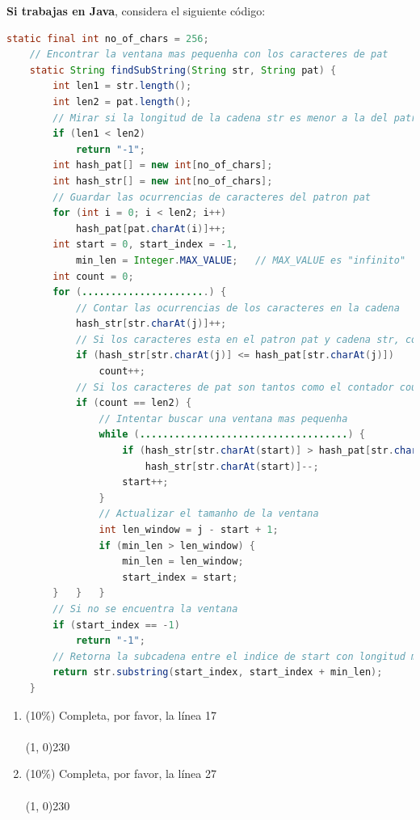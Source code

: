 \documentclass[10 pt]{article}
\begin{document}
\hspace{1 cm}

\textbf{Si trabajas en Java}, considera el siguiente código:

{\footnotesize
\begin{lstlisting}[language = java]
    static final int no_of_chars = 256;
    // Encontrar la ventana mas pequenha con los caracteres de pat
    static String findSubString(String str, String pat) {
        int len1 = str.length();
        int len2 = pat.length();
        // Mirar si la longitud de la cadena str es menor a la del patron pat
        if (len1 < len2) 
            return "-1";        
        int hash_pat[] = new int[no_of_chars];
        int hash_str[] = new int[no_of_chars];        
        // Guardar las ocurrencias de caracteres del patron pat
        for (int i = 0; i < len2; i++)
            hash_pat[pat.charAt(i)]++;
        int start = 0, start_index = -1,
            min_len = Integer.MAX_VALUE;   // MAX_VALUE es "infinito"
        int count = 0;
        for (......................) {
            // Contar las ocurrencias de los caracteres en la cadena 
            hash_str[str.charAt(j)]++;
            // Si los caracteres esta en el patron pat y cadena str, contar
            if (hash_str[str.charAt(j)] <= hash_pat[str.charAt(j)])
                count++; 
            // Si los caracteres de pat son tantos como el contador count 
            if (count == len2) {               
                // Intentar buscar una ventana mas pequenha
                while (....................................) { 
                    if (hash_str[str.charAt(start)] > hash_pat[str.charAt(start)])
                        hash_str[str.charAt(start)]--;
                    start++;
                }
                // Actualizar el tamanho de la ventana 
                int len_window = j - start + 1;
                if (min_len > len_window) {
                    min_len = len_window;
                    start_index = start;                
        }   }   } 
        // Si no se encuentra la ventana 
        if (start_index == -1)             
            return "-1";
        // Retorna la subcadena entre el indice de start con longitud min_len
        return str.substring(start_index, start_index + min_len);
    }
\end{lstlisting}
}


\begin{enumerate}[label=(\Alph*)]

  \item (10\%) Completa, por favor, la línea 17 \\ \\
   \line(1, 0){230}\\

  \item (10\%) Completa, por favor, la línea 27 \\ \\
   \line(1, 0){230}\\


\end{enumerate}
\end{document}
